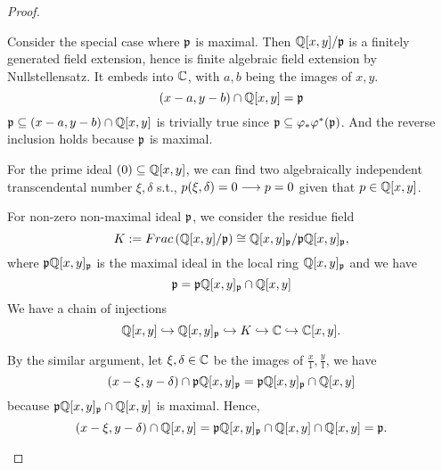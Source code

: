 \documentclass[11pt,fleqn]{book}
\begin{document}
\begin{proof}
\begin{enumerate}[label=(\alph*)]
Consider the special case where ${\mathfrak p}$ is maximal. Then $\mathbb Q[x,y]/{\mathfrak p}$ is a finitely generated field extension, hence is finite algebraic field extension by Nullstellensatz. It embeds into $\mathbb C$, with $a,b$ being the images of $x,y$.
$$
(x-a,y-b)\cap \mathbb Q[x,y]={\mathfrak p}
$$
${\mathfrak p}\subseteq (x-a,y-b)\cap \mathbb Q[x,y]$ is trivially true since ${\mathfrak p}\subseteq \varphi_*\varphi^*({\mathfrak p})$. And the reverse inclusion holds because ${\mathfrak p}$ is maximal.

For the prime ideal $(0)\subseteq \mathbb Q[x,y]$, we can find two algebraically independent transcendental number $\xi,\delta$ s.t., $p(\xi,\delta)=0\longrightarrow p=0$ given that $p\in \mathbb Q[x,y]$.

For non-zero non-maximal ideal ${\mathfrak p}$, we consider the residue field
$$
K:=Frac\left(\mathbb Q[x,y]/{\mathfrak p}\right)\cong \mathbb Q[x,y]_{\mathfrak p}/{\mathfrak p}\mathbb Q[x,y]_{\mathfrak p},
$$
where ${\mathfrak p}\mathbb Q[x,y]_{\mathfrak p}$ is the maximal ideal in the local ring $\mathbb Q[x,y]_{\mathfrak p}$ and we have
$$
{\mathfrak p}={\mathfrak p}\mathbb Q[x,y]_{\mathfrak p}\cap \mathbb Q[x,y]
$$
We have a chain of injections
$$
\mathbb Q[x,y]\hookrightarrow\mathbb Q[x,y]_{\mathfrak p}\hookrightarrow K\hookrightarrow \mathbb C\hookrightarrow\mathbb C[x,y].
$$

By the similar argument, let $\xi,\delta\in \mathbb C$ be the images of $\frac{x}{1},\frac{y}{1}$, we have 
$$
(x-\xi,y-\delta)\cap {\mathfrak p}\mathbb Q[x,y]_{\mathfrak p}={\mathfrak p}\mathbb Q[x,y]_{\mathfrak p}\cap \mathbb Q[x,y]
$$ 
because ${\mathfrak p}\mathbb Q[x,y]_{\mathfrak p}\cap \mathbb Q[x,y]$ is maximal. Hence,
$$
(x-\xi,y-\delta)\cap \mathbb Q[x,y]={\mathfrak p}\mathbb Q[x,y]_{\mathfrak p}\cap \mathbb Q[x,y]\cap \mathbb Q[x,y]={\mathfrak p}.
$$



\end{enumerate}
\end{proof}
\end{document}

